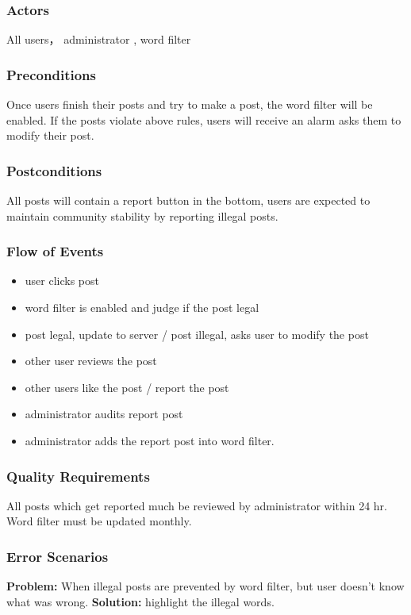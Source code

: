 \documentclass[12pt]{article}
\begin{document}
  \subsubsection{Actors}
  All users， administrator , word filter


  \subsubsection{Preconditions}
  Once users finish their posts and try to make a post, the word filter will be enabled. If the posts violate above rules, users will receive an alarm asks them to modify their post.


  \subsubsection{Postconditions}
   All posts will contain a report button in the bottom,  users are expected to maintain community stability by reporting illegal posts.


  \subsubsection{Flow of Events}
  \begin{itemize}
    \item user clicks post
    \item word filter is enabled and judge if the post legal
    \item post legal, update to server / post illegal,  asks user to modify the post
    \item  other user reviews the post
    \item  other users like the post / report the post
    \item administrator audits report post
    \item administrator adds the report post into word filter.
  \end{itemize}

  \subsubsection{Quality Requirements}
  All posts which get reported much be reviewed by administrator within 24 hr.
  Word filter must be updated monthly.


  \subsubsection{Error Scenarios}
  \textbf{Problem:}
  When illegal posts are prevented by word filter, but user doesn’t know what was wrong.
  \textbf{Solution:}
  highlight the illegal words.
\end{document}
